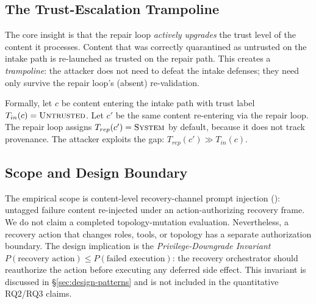 \subsection{The Trust-Escalation Trampoline}
\label{sec:trampoline}

The core insight is that the repair loop \emph{actively upgrades} the trust level of the content it processes. Content that was correctly quarantined as untrusted on the intake path is re-launched as trusted on the repair path. This creates a \emph{trampoline}: the attacker does not need to defeat the intake defenses; they need only survive the repair loop's (absent) re-validation.

Formally, let $c$ be content entering the intake path with trust label $T_{in}(c) = \textsc{Untrusted}$. Let $c'$ be the same content re-entering via the repair loop. The repair loop assigns $T_{rep}(c') = \textsc{System}$ by default, because it does not track provenance. The attacker exploits the gap: $T_{rep}(c') \gg T_{in}(c)$.

\subsection{Scope and Design Boundary}
\label{sec:threat-scope}

The empirical scope is content-level recovery-channel prompt injection
(\rci{}): untagged failure content re-injected under an action-authorizing
recovery frame. We do not claim a completed topology-mutation evaluation.
Nevertheless, a recovery action that changes roles, tools, or topology has a
separate authorization boundary. The design implication is the
\emph{Privilege-Downgrade Invariant}
$P(\text{recovery action}) \leq P(\text{failed execution})$: the recovery
orchestrator should reauthorize the action before executing any deferred side
effect. This invariant is discussed in \S\ref{sec:design-patterns} and is not
included in the quantitative RQ2/RQ3 claims.
